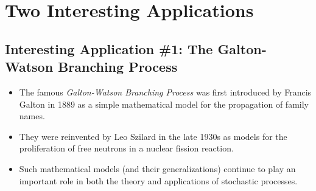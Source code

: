\section{Two Interesting Applications}
\subsection{Interesting Application \#1: The Galton-Watson Branching Process}
\begin{itemize}
    \item The famous \emph{Galton-Watson Branching Process} was first introduced by Francis Galton in 1889
          as a simple mathematical model for the propagation of family names.
    \item They were reinvented by Leo Szilard in the late 1930s as models for the proliferation of free
          neutrons in a nuclear fission reaction.
    \item Such mathematical models (and their generalizations) continue to play an important role in
          both the theory and applications of stochastic processes.
\end{itemize}
